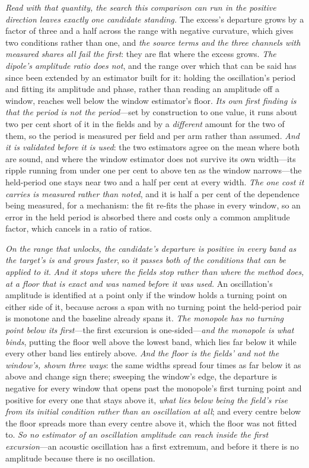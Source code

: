 \documentclass[11pt,a4paper]{article}
\theoremstyle{plain}
\theoremstyle{definition}
\theoremstyle{remark}
\begin{document}
\emph{Read with that quantity, the search this comparison can run in the positive direction leaves exactly
one candidate standing.} The excess's departure grows by a factor of three and a half across the range with
negative curvature, which gives two conditions rather than one, and \emph{the source terms and the three
channels with measured shares all fail the first}: they are flat where the excess grows. \emph{The dipole's
amplitude ratio does not}, and the range over which that can be said has since been extended by an estimator
built for it: holding the oscillation's period and fitting its amplitude and phase, rather than reading an
amplitude off a window, reaches well below the window estimator's floor. \emph{Its own first finding is that
the period is not the period}---set by construction to one value, it runs about two per cent short of it in
the fields and by a \emph{different} amount for the two of them, so the period is measured per field and per
arm rather than assumed. \emph{And it is validated before it is used}: the two estimators agree on the mean
where both are sound, and where the window estimator does not survive its own width---its ripple running from
under one per cent to above ten as the window narrows---the held-period one stays near two and a half per cent
at every width. \emph{The one cost it carries is measured rather than noted}, and it is half a per cent of the
dependence being measured, for a mechanism: the fit re-fits the phase in every window, so an error in the
held period is absorbed there and costs only a common amplitude factor, which cancels in a ratio of ratios.

\emph{On the range that unlocks, the candidate's departure is positive in every band as the target's is and
grows faster}, so \emph{it passes both of the conditions that can be applied to it}. \emph{And it stops where the fields stop rather than where the method does, at a floor that is exact and
was named before it was used.} An oscillation's amplitude is identified at a point only if the window holds
a turning point on either side of it, because across a span with no turning point the held-period pair is
monotone and the baseline already spans it. \emph{The monopole has no turning point below its first}---the
first excursion is one-sided---\emph{and the monopole is what binds}, putting the floor well above the
lowest band, which lies far below it while every other band lies entirely above. \emph{And the floor is the
fields' and not the window's, shown three ways}: the same widths spread four times as far below it as above
and change sign there; sweeping the window's edge, the departure is negative for every window that opens
past the monopole's first turning point and positive for every one that stays above it, \emph{what lies
below being the field's rise from its initial condition rather than an oscillation at all}; and every centre
below the floor spreads more than every centre above it, which the floor was not fitted to. \emph{So no
estimator of an oscillation amplitude can reach inside the first excursion}---an acoustic oscillation has a
first extremum, and before it there is no amplitude because there is no oscillation.
\end{document}
